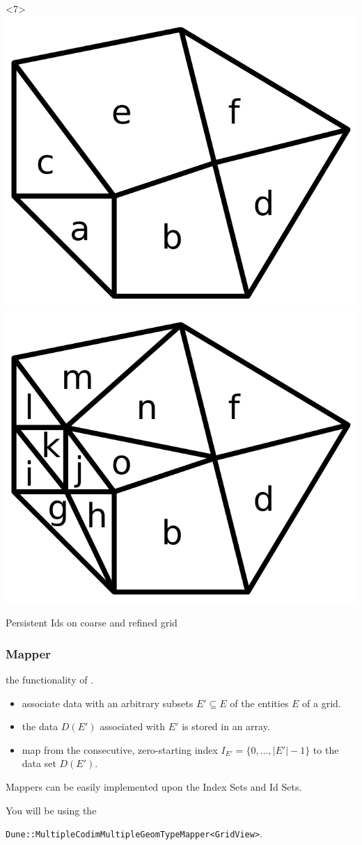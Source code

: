 \documentclass[aspectratio=169,11pt]{beamer}
\theoremstyle{definition}
\begin{document}
\begin{frame}
\begin{overlayarea}{\linewidth}{0.45\linewidth}
\begin{center}
    \begin{onlyenv}<7>
      \includegraphics[width=0.4\linewidth]{index-id0}
      \hfill
      \includegraphics[width=0.4\linewidth]{index-id1}\par
      Persistent Ids on coarse and refined grid\par
    \end{onlyenv}

    \end{center}
  \end{overlayarea}
\end{frame}

\begin{frame} \frametitle{Mapper}
   the functionality of .

  \medskip
  \begin{itemize}
  \item associate data with an arbitrary subsets $E'\subseteq E$
    of the entities $E$ of a grid.
  \item the data $D(E')$ associated with
    $E'$ is stored in an array.
  \item map from the consecutive, zero-starting index $I_{E'} =
    \{0, \ldots, |E'|-1\}$ to the data set $D(E')$.
  \end{itemize}

  \medskip
  Mappers can be easily implemented upon the Index Sets and Id Sets.

  \pause \medskip
  You will be using the

  \begin{codeblock}
  \centering
  \lstinline!Dune::MultipleCodimMultipleGeomTypeMapper<GridView>!.
  \end{codeblock}
\end{frame}
\end{document}
